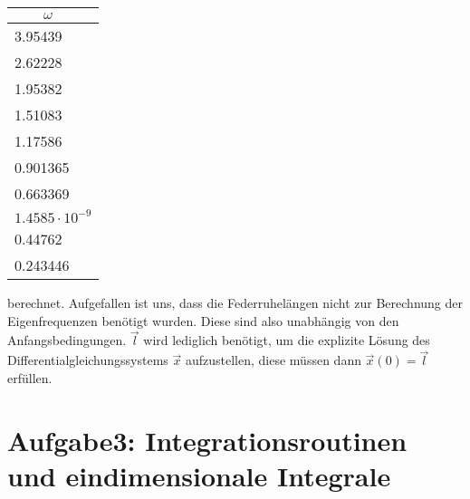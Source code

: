 \FloatBarrier
\begin{table}[h]
    \centering
    \begin{tabular}{l}
        \textbf{$\qquad \omega$} \\
        \toprule 3.95439 \\ 2.62228 \\ 1.95382 \\ 1.51083 \\ 1.17586 \\ 0.901365 \\ 0.663369 \\ $1.4585\cdot 10^{-9}$ \\ 0.44762 \\ 0.243446 \\
        \bottomrule
    \end{tabular}
\end{table}
\noindent
\FloatBarrier
\noindent
berechnet. Aufgefallen ist uns, dass die Federruhelängen nicht zur Berechnung der Eigenfrequenzen benötigt wurden. Diese sind also unabhängig von den Anfangsbedingungen. $\vec{l}$ wird lediglich benötigt, um die explizite Lösung des Differentialgleichungssystems $\vec{x}$ aufzustellen, diese müssen dann $\vec{x}(0) = \vec{l}$ erfüllen.

\section*{Aufgabe3: Integrationsroutinen und eindimensionale Integrale}


